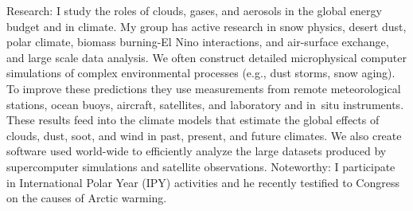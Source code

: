\documentclass[11pt,twoside]{article}
\begin{document}
{{%
Research: I study the roles of clouds, gases, and aerosols in
the global energy budget and in climate.
My group has active research in snow physics, desert dust, polar
climate, biomass burning-El Nino interactions, and air-surface
exchange, and large scale data analysis.   
We often construct detailed microphysical computer simulations of
complex environmental processes (e.g., dust storms, snow aging). 
To improve these predictions they use measurements from 
remote meteorological stations, ocean buoys, aircraft, satellites, and
laboratory and in~situ instruments. 
These results feed into the climate models that estimate the global
effects of clouds, dust, soot, and wind in past, present, and future
climates.       
We also create software used world-wide to efficiently analyze the
large datasets produced by supercomputer simulations and satellite
observations.  
Noteworthy: I participate in International Polar Year (IPY) activities
and he recently testified to Congress on the causes of Arctic warming.   
} %
} %


\end{document}
